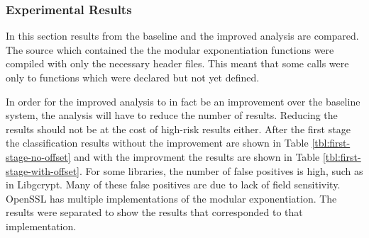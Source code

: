 \documentclass[11pt,a4paper]{article}
\begin{document}
\subsubsection{Experimental Results}

In this section results from the baseline and the improved analysis are
compared. The source which contained the the modular exponentiation functions
were compiled with only the necessary header files. This meant that some
calls were only to functions which were declared but not yet defined.

In order for the improved analysis to in fact be an improvement over the
baseline system, the analysis will have to reduce the number of results.
Reducing the results should not be at the cost of high-risk results either.
After the first stage the classification results without the improvement are
shown in Table \ref{tbl:first-stage-no-offset} and with the improvment the
results are shown in Table \ref{tbl:first-stage-with-offset}. For some
libraries, the number of false positives is high, such as in Libgcrypt. Many of
these false positives are due to lack of field sensitivity. OpenSSL has multiple
implementations of the modular exponentiation. The results were separated to
show the results that corresponded to that implementation.

\begin{table}
  \centering
  \caption{Stage 1 Classification - Field Insensitive}
  \label{tbl:first-stage-no-offset}
\end{table}
\end{document}
